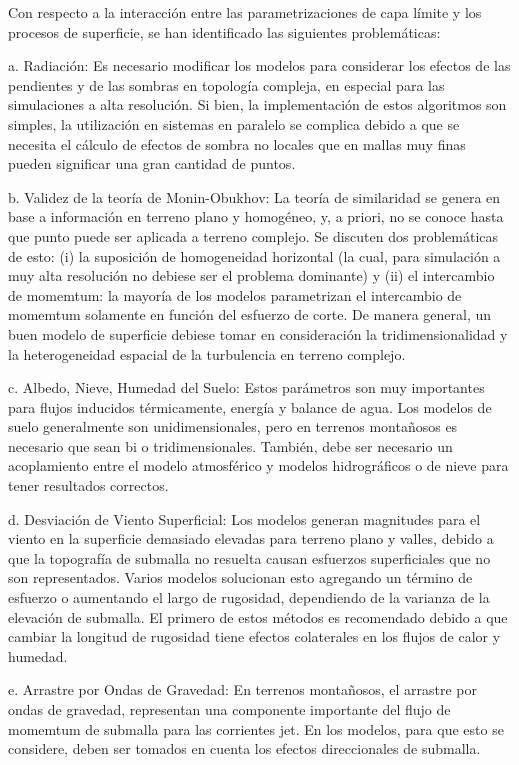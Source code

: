 Con respecto a la interacción entre las parametrizaciones de capa límite y los procesos de superficie, se han identificado las siguientes problemáticas:
\begin{enumerate*}
	\item[a.] Radiación: Es necesario modificar los modelos para considerar los efectos de las pendientes y de las sombras en topología compleja, en especial para las simulaciones a alta resolución. Si bien, la implementación de estos algoritmos son simples, la utilización en sistemas en paralelo se complica debido a que se necesita el cálculo de efectos de sombra no locales que en mallas muy finas pueden significar una gran cantidad de puntos.
	\item[b.] Validez de la teoría de Monin-Obukhov: La teoría de similaridad se genera en base a información en terreno plano y homogéneo, y, a priori, no se conoce hasta que punto puede ser aplicada a terreno complejo. Se discuten dos problemáticas de esto: (i) la suposición de homogeneidad horizontal (la cual, para simulación a muy alta resolución no debiese ser el problema dominante) y (ii) el intercambio de momemtum: la mayoría de los modelos parametrizan el intercambio de momemtum solamente en función del esfuerzo de corte. De manera general, un buen modelo de superficie debiese tomar en consideración la tridimensionalidad y la heterogeneidad espacial de la turbulencia en terreno complejo.
	\item[c.] Albedo, Nieve, Humedad del Suelo: Estos parámetros son muy importantes para flujos inducidos térmicamente, energía y balance de agua. Los modelos de suelo generalmente son unidimensionales, pero en terrenos montañosos es necesario  que sean bi o tridimensionales. También, debe ser necesario un acoplamiento entre el modelo atmosférico  y modelos hidrográficos o de nieve para tener resultados correctos. 
	\item[d.] Desviación de Viento Superficial: Los modelos generan magnitudes para el viento en la superficie demasiado elevadas para terreno plano y valles, debido a que la topografía de submalla no resuelta causan esfuerzos superficiales que no son representados. Varios modelos solucionan esto agregando un término de esfuerzo o aumentando el largo de rugosidad, dependiendo de la varianza de la elevación de submalla. El primero de estos métodos es recomendado debido a que cambiar la longitud de rugosidad tiene efectos colaterales en los flujos de calor y humedad.
	\item[e.] Arrastre por Ondas de Gravedad: En terrenos montañosos, el arrastre por ondas de gravedad, representan una componente importante del flujo de momemtum de submalla para las corrientes jet. En los modelos, para que esto se considere, deben ser tomados en cuenta los efectos direccionales de submalla.
\end{enumerate*}

